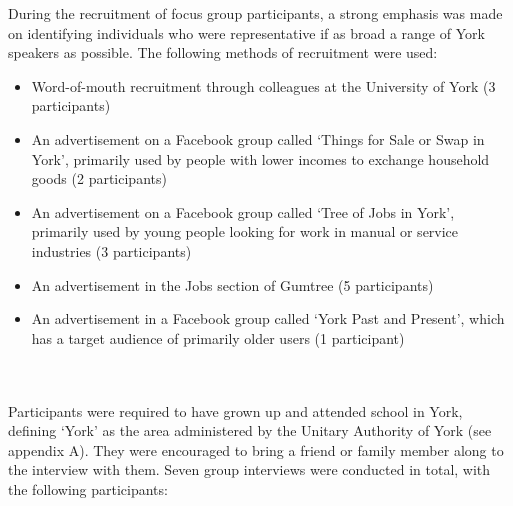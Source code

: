 \documentclass{article}
\begin{document}
During the recruitment of focus group participants, a strong emphasis was made on identifying individuals who were representative if as broad a range of York speakers as possible. The following methods of recruitment were used:

\begin{itemize}
\item{Word-of-mouth recruitment through colleagues at the University of York (3 participants)}
\item{An advertisement on a Facebook group called `Things for Sale or Swap in York', primarily used by people with lower incomes to exchange household goods (2 participants)}
\item{An advertisement on a Facebook group called `Tree of Jobs in York', primarily used by young people looking for work in manual or service industries (3 participants)}
\item{An advertisement in the Jobs section of Gumtree (5 participants)}
\item{An advertisement in a Facebook group called `York Past and Present', which has a target audience of primarily older users (1 participant)}
\end{itemize}

\noindent{}
\\\\
Participants were required to have grown up and attended school in York, defining `York' as the area administered by the Unitary Authority of York (see appendix A). They were encouraged to bring a friend or family member along to the interview with them. Seven group interviews were conducted in total, with the following participants:
\end{document}

